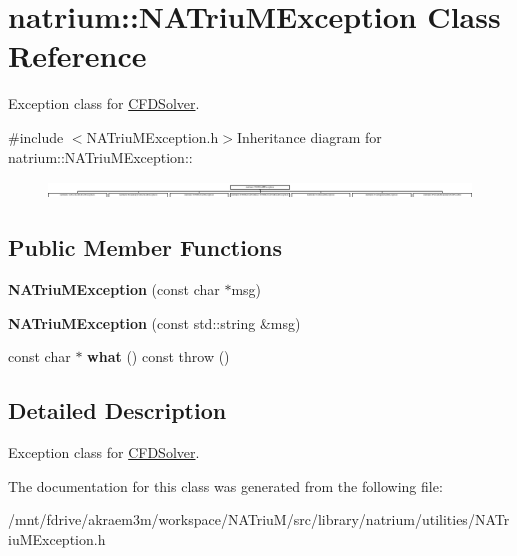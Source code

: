 \hypertarget{classnatrium_1_1NATriuMException}{
\section{natrium::NATriuMException Class Reference}
\label{classnatrium_1_1NATriuMException}
}


Exception class for \hyperlink{classnatrium_1_1CFDSolver}{CFDSolver}.  


{\ttfamily \#include $<$NATriuMException.h$>$}Inheritance diagram for natrium::NATriuMException::\begin{figure}[H]
\begin{center}
\leavevmode
\includegraphics[height=0.481928cm]{classnatrium_1_1NATriuMException}
\end{center}
\end{figure}
\subsection*{Public Member Functions}
\begin{DoxyCompactItemize}
\item 
\hypertarget{classnatrium_1_1NATriuMException_aadad1a8a8839c17b06fdbf8a7193a034}{
{\bfseries NATriuMException} (const char $\ast$msg)}
\label{classnatrium_1_1NATriuMException_aadad1a8a8839c17b06fdbf8a7193a034}

\item 
\hypertarget{classnatrium_1_1NATriuMException_a0616fc08feadba7260bab159cf042dc4}{
{\bfseries NATriuMException} (const std::string \&msg)}
\label{classnatrium_1_1NATriuMException_a0616fc08feadba7260bab159cf042dc4}

\item 
\hypertarget{classnatrium_1_1NATriuMException_a3d40904ddcd321e87cdd85e73e031c61}{
const char $\ast$ {\bfseries what} () const   throw ()}
\label{classnatrium_1_1NATriuMException_a3d40904ddcd321e87cdd85e73e031c61}

\end{DoxyCompactItemize}


\subsection{Detailed Description}
Exception class for \hyperlink{classnatrium_1_1CFDSolver}{CFDSolver}. 

The documentation for this class was generated from the following file:\begin{DoxyCompactItemize}
\item 
/mnt/fdrive/akraem3m/workspace/NATriuM/src/library/natrium/utilities/NATriuMException.h\end{DoxyCompactItemize}
